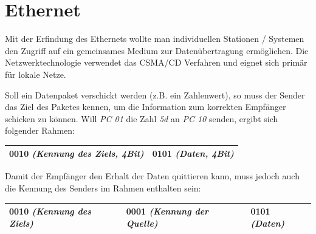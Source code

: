 \documentclass[12pt,a4paper]{article}
\begin{document}
		\section{Ethernet}
			Mit der Erfindung des Ethernets wollte man individuellen Stationen / Systemen den Zugriff auf ein gemeinsames Medium zur Datenübertragung ermöglichen. Die Netzwerktechnologie verwendet das CSMA/CD Verfahren und eignet sich primär für lokale Netze.
			\begin{figure}[h]
				\centering
			\end{figure}\newline
			Soll ein Datenpaket verschickt werden (z.B. ein Zahlenwert), so muss der Sender das Ziel des Paketes kennen, um die Information zum korrekten Empfänger schicken zu können. \newline
			Will \textit{PC 01} die Zahl \textit{5d} an \textit{PC 10} senden, ergibt sich folgender Rahmen:
			\begin{center}
				\begin{tabularx}{14cm}{|X|X|}
					\hline
					0010 \textit{(Kennung des Ziels, 4Bit)}&0101 \textit{(Daten, 4Bit)}\\
					\hline
				\end{tabularx}
			\end{center}
			Damit der Empfänger den Erhalt der Daten quittieren kann, muss jedoch auch die Kennung des Senders im Rahmen enthalten sein:
			\begin{center}
				\begin{tabularx}{17cm}{|X|X|X|}
					\hline
					0010 \textit{(Kennung des Ziels)}&0001 \textit{(Kennung der Quelle)}&0101 \textit{(Daten)}\\
					\hline
				\end{tabularx}
			\end{center}
\end{document}
